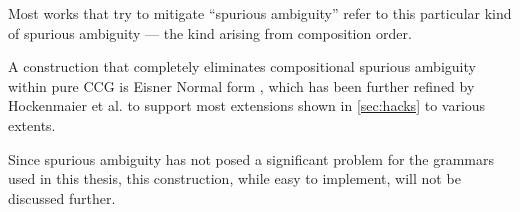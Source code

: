 \documentclass[main.tex]{subfiles}
\begin{document}
Most works that try to mitigate ``spurious ambiguity'' refer to this particular
kind of spurious ambiguity --- the kind arising from composition order.

A construction that completely eliminates compositional spurious ambiguity
within pure CCG is Eisner Normal form \cite{eisner}, which has been further
refined by Hockenmaier et al. \cite{julia} to support most extensions shown
in \cref{sec:hacks} to various extents.

Since spurious ambiguity has not posed a significant problem for the grammars used
in this thesis, this construction, while easy to implement, will not be
discussed further.
\end{document}
